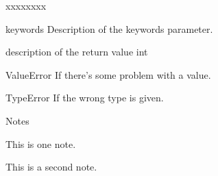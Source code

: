 \documentclass{article}
\begin{document}
\begin{EpydocFunctionList}
{\begin{EpydocFunctionParameters}{xxxxxxxx}
        \item[keywords] Description of the keywords parameter.
      \end{EpydocFunctionParameters}
    }{
      description of the return value
    }{
      int
    }{
      \begin{EpydocFunctionRaises}
        \item[ValueError] If there's some problem with a value.
        \item[TypeError] If the wrong type is given.
      \end{EpydocFunctionRaises}
    }{
    }{
  
  
      \begin{EpydocMetadataLongList}{Notes}
        \item This is one note.
        \item This is a second note.
      \end{EpydocMetadataLongList}
    }


      {}{}{}{}{}{}{}

  \end{EpydocFunctionList} 
\end{document}
